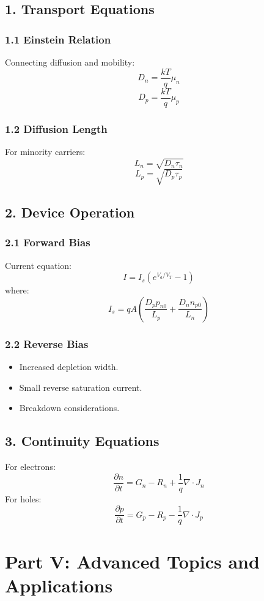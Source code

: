 \documentclass[12pt]{article}
\begin{document}
\subsection{1. Transport Equations}

\subsubsection{1.1 Einstein Relation}
Connecting diffusion and mobility:
\[
D_n = \frac{kT}{q}\mu_n
\]
\[
D_p = \frac{kT}{q}\mu_p
\]

\subsubsection{1.2 Diffusion Length}
For minority carriers:
\[
L_n = \sqrt{D_n \tau_n}
\]
\[
L_p = \sqrt{D_p \tau_p}
\]

\subsection{2. Device Operation}

\subsubsection{2.1 Forward Bias}
Current equation:
\[
I = I_s \left( e^{V_a/V_T} - 1 \right)
\]
where:
\[
I_s = qA \left( \frac{D_p p_{n0}}{L_p} + \frac{D_n n_{p0}}{L_n} \right)
\]

\subsubsection{2.2 Reverse Bias}
\begin{itemize}
    \item Increased depletion width.
    \item Small reverse saturation current.
    \item Breakdown considerations.
\end{itemize}

\subsection{3. Continuity Equations}
For electrons:
\[
\frac{\partial n}{\partial t} = G_n - R_n + \frac{1}{q} \nabla \cdot J_n
\]
For holes:
\[
\frac{\partial p}{\partial t} = G_p - R_p - \frac{1}{q} \nabla \cdot J_p
\]

\section{Part V: Advanced Topics and Applications}
\end{document}
